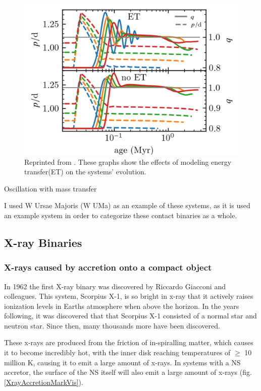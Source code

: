 \documentclass[12pt, a4paper]{article}
\begin{document}
        \begin{figure}[H]
            \centering
            \includegraphics[scale = .3]{figs/reused-figs/q-ratio_evolution_farby.png}
            \caption{Reprinted from \cite{Fabry_2025}. These graphs show the effects of modeling energy transfer(ET) on the systems' evolution.}
            \label{qEvolution}
        \end{figure}

        Oscillation with mass transfer

        
        I used W Ursae Majoris (W UMa) as an example of these systems, as it is used an example system in order to categorize these contact binaries as a whole.
    \subsection{X-ray Binaries} 
        \subsubsection{X-rays caused by accretion onto a compact object} \label{XrayAccretion}
            In 1962 the first X-ray binary was discovered by Riccardo Giacconi and colleagues. This system, Scorpius X-1, is so bright in x-ray that it actively raises ionization levels in Earths atmosphere when above the horizon. \cite{TaurisvandenHeuvel+2023} \cite{Giacconi_1962} In the years following, it was discovered that that Scorpius X-1 consisted of a normal star and neutron star. Since then, many thousands more have been discovered\cite{Haardt_1993}.

            These x-rays are produced from the friction of in-spiralling matter, which causes it to become incredibly hot, with the inner disk reaching temperatures of $\geq$ 10 million K, causing it to emit a large amount of x-rays. In systems with a NS accretor, the surface of the NS itself will also emit a large amount of x-rays \cite{TaurisvandenHeuvel+2023} (fig. \ref{XrayAccretionMarkVis}). 
\end{document}
